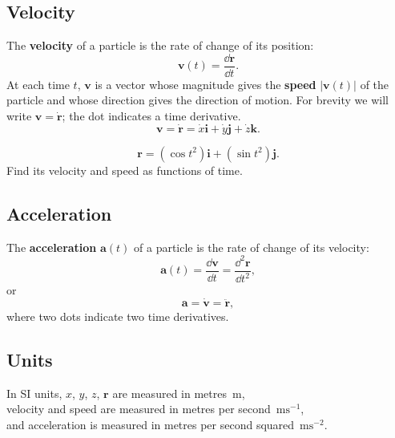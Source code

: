 \subsection{Velocity}

The {\bf velocity} of a particle is the rate of change of its position:
\begin{displaymath}
\boldsymbol{v}(t) = \frac{\dd \boldsymbol{r}}{\dd t} .
\end{displaymath}
At each time $t$, $\boldsymbol{v}$ is a vector whose magnitude gives the {\bf speed}
$|\boldsymbol{v} (t)|$ of the particle and whose direction gives the direction of
motion.
For brevity we will write $\boldsymbol{v} = \dot{\boldsymbol{r}}$; the dot indicates a
time derivative.
\begin{displaymath}
\boldsymbol{v} = \dot{\boldsymbol{r}} = \dot{x} \boldsymbol{i} + \dot{y} \boldsymbol{j} + \dot{z} \boldsymbol{k} .
\end{displaymath}

\begin{displaymath}
\boldsymbol{r} = (\cos t^2 ) \boldsymbol{i} + (\sin t^2) \boldsymbol{j} .
\end{displaymath}
Find its velocity and speed as functions of time.


\subsection{Acceleration}

The {\bf acceleration} $\boldsymbol{a}(t)$ of a particle is the rate of change of its
velocity:
\begin{displaymath}
\boldsymbol{a}(t) = \frac{\dd \boldsymbol{v}}{\dd t}  = \frac{\dd^2 \boldsymbol{r}}{\dd t^2},
\end{displaymath}
or
\begin{displaymath}
\boldsymbol{a} = \dot{\boldsymbol{v}} = \ddot{\boldsymbol{r}} ,
\end{displaymath}
where two dots indicate two time derivatives.



\subsection{Units}

In SI units, $x$, $y$, $z$, $\boldsymbol{r}$ are measured in metres~$\mathrm{m}$,\\
velocity and speed are measured in metres per second~$\mathrm{ms}^{-1}$,\\
and acceleration is measured in metres per second squared~$\mathrm{ms}^{-2}$.

